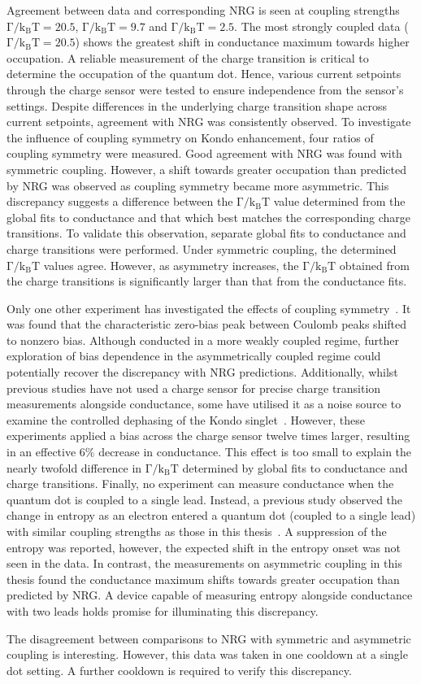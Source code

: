 Agreement between data and corresponding NRG is seen at coupling strengths $\mathrm{\Gamma/k_BT} = 20.5$, $\mathrm{\Gamma/k_BT} = 9.7$ and $\mathrm{\Gamma/k_BT} = 2.5$. The most strongly coupled data ($\mathrm{\Gamma/k_BT} = 20.5$) shows the greatest shift in conductance maximum towards higher occupation. 
A reliable measurement of the charge transition is critical to determine the occupation of the quantum dot. 
Hence, various current setpoints through the charge sensor were tested to ensure independence from the sensor's settings.
Despite differences in the underlying charge transition shape across current setpoints, agreement with NRG was consistently observed.
To investigate the influence of coupling symmetry on Kondo enhancement, four ratios of coupling symmetry were measured.
Good agreement with NRG was found with symmetric coupling. 
However, a shift towards greater occupation than predicted by NRG was observed as coupling symmetry became more asymmetric.
This discrepancy suggests a difference between the $\mathrm{\Gamma/k_BT}$ value determined from the global fits to conductance and that which best matches the corresponding charge transitions. 
To validate this observation, separate global fits to conductance and charge transitions were performed. Under symmetric coupling, the determined $\mathrm{\Gamma/k_BT}$ values agree. However, as asymmetry increases, the $\mathrm{\Gamma/k_BT}$ obtained from the charge transitions is significantly larger than that from the conductance fits.

Only one other experiment has investigated the effects of coupling symmetry~\cite{kondo_asymmetric}. 
It was found that the characteristic zero-bias peak between Coulomb peaks shifted to nonzero bias. 
Although conducted in a more weakly coupled regime, further exploration of bias dependence in the asymmetrically coupled regime could potentially recover the discrepancy with NRG predictions. 
Additionally, whilst previous studies have not used a charge sensor for precise charge transition measurements alongside conductance, some have utilised it as a noise source to examine the controlled dephasing of the Kondo singlet~\cite{kondo_controlled_dephasing}. 
However, these experiments applied a bias across the charge sensor twelve times larger, resulting in an effective $6\%$ decrease in conductance. 
This effect is too small to explain the nearly twofold difference in $\mathrm{\Gamma/k_BT}$ determined by global fits to conductance and charge transitions.
Finally, no experiment can measure conductance when the quantum dot is coupled to a single lead. 
Instead, a previous study observed the change in entropy as an electron entered a quantum dot (coupled to a single lead) with similar coupling strengths as those in this thesis~\cite{child_strong}. 
A suppression of the entropy was reported, however, the expected shift in the entropy onset was not seen in the data. 
In contrast, the measurements on asymmetric coupling in this thesis found the conductance maximum shifts towards greater occupation than predicted by NRG.
A device capable of measuring entropy alongside conductance with two leads holds promise for illuminating this discrepancy.


The disagreement between comparisons to NRG with symmetric and asymmetric coupling is interesting. However, this data was taken in one cooldown at a single dot setting. A further cooldown is required to verify this discrepancy.